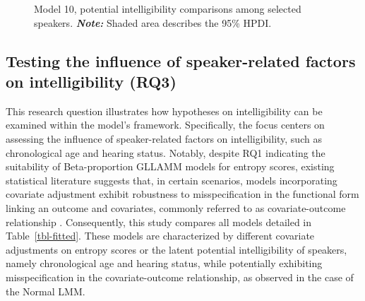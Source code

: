 \documentclass[
  authoryear,
  preprint,
  1p]{elsarticle}
\begin{document}
\label{cell-fig-si_contr_model10}
\begin{figure}[H]


\caption{\label{fig-si_contr_model10}Model 10, potential intelligibility
comparisons among selected speakers. {\textbf{\emph{Note:}} Shaded area
describes the 95\% HPDI.}}

\end{figure}%

\subsection{Testing the influence of speaker-related factors on
intelligibility (RQ3)}\label{sec-R-RQ3}

{This research question illustrates how hypotheses on intelligibility
can be examined within the model's framework.} Specifically, the focus
centers on assessing the influence of speaker-related factors on
intelligibility, such as chronological age and hearing status. Notably,
despite RQ1 indicating the suitability of Beta-proportion GLLAMM models
for entropy scores, existing statistical literature suggests that, in
certain scenarios, models incorporating covariate adjustment exhibit
robustness to misspecification in the functional form linking an outcome
and covariates, commonly referred to as covariate-outcome relationship
\citep{Tackney_et_al_2023}. Consequently, this study compares all models
detailed in Table~\ref{tbl-fitted}. These models are characterized by
different covariate adjustments on entropy scores or the latent
potential intelligibility of speakers, namely chronological age and
hearing status, while potentially exhibiting misspecification in the
covariate-outcome relationship, as observed in the case of the Normal
LMM.
\end{document}

